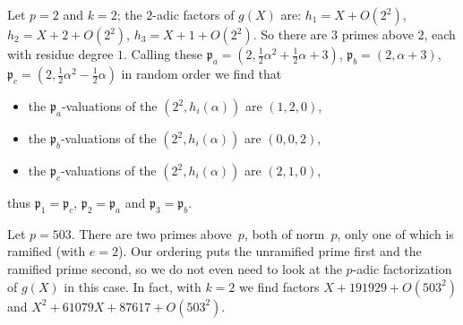 \documentclass{article}
\def\p{{\mathfrak p}}
\begin{document}
Let $p=2$ and $k=2$; the $2$-adic factors of $g(X)$ are: $h_1=X+O(2^2)$,
$h_2=X+2+O(2^2)$, $h_3=X+1+O(2^2)$.  So there are $3$
primes above $2$, each with residue degree $1$.
Calling these $\p_a = (2,\frac 12\alpha^2+\frac 12\alpha+3)$, $\p_b =
(2,\alpha+3)$, $\p_c = (2,\frac 12\alpha^2-\frac 12\alpha)$ in random order we find that
\begin{itemize}
  \item the $\p_a$-valuations of the $(2^2,h_i(\alpha))$ are $(1,2,0)$,
  \item the $\p_b$-valuations of the $(2^2,h_i(\alpha))$ are $(0,0,2)$,
  \item the $\p_c$-valuations of the $(2^2,h_i(\alpha))$ are $(2,1,0)$,
\end{itemize}
thus $\p_1=\p_c$, $\p_2=\p_a$ and $\p_3=\p_b$.

Let $p=503$.  There are two primes above~$p$, both of norm~$p$, only
one of which is ramified (with $e=2$). Our ordering puts the
unramified prime first and the ramified prime second, so we do not even need to
look at the $p$-adic factorization of $g(X)$ in this case.  In fact,
with $k=2$ we find factors $X+191929+O(503^2)$ and $X^2+61079X+87617+O(503^2)$.
\end{document}

